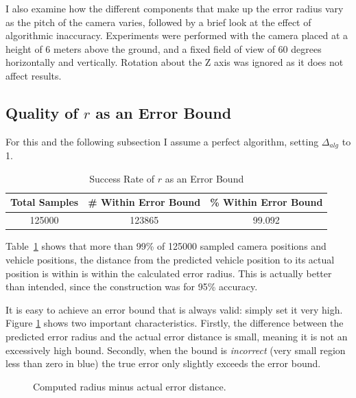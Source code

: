 \documentclass[a4paper,12pt,twoside,openright]{report}
\begin{document}
I also examine how the different components that make up the error radius vary
as the pitch of the camera varies, followed by a brief look at the
effect of algorithmic inaccuracy. Experiments were performed
with the camera placed at a height of 6 meters above the ground, and a fixed
field of view of 60 degrees horizontally and vertically. Rotation about the Z axis
was ignored as it does not affect results.

\subsection{Quality of $r$ as an Error Bound}

For this and the following subsection I assume a perfect algorithm,
setting $\Delta_{alg}$ to 1.

\begin{table}[htb]
    \centering
    \caption[$r$ as an ErrorBound]{Success Rate of $r$ as an Error Bound}
    \label{tab:camera:bound accuracy}
    \begin{tabular}{@{}ccc@{}}
        \toprule
        Total Samples & \# Within Error Bound & \% Within Error Bound \\ \midrule
        125000        & 123865                     & 99.092               
    \end{tabular}
\end{table}

Table~\ref{tab:camera:bound accuracy} shows that more than 99\% of 125000 sampled camera positions
and vehicle positions, the distance from the predicted vehicle position to 
its actual position is within is within the calculated error radius. This
is actually better than intended, since the construction was for 95\% accuracy.

It is easy to achieve an error bound that is always valid: simply set it very high.
Figure \ref{fig:camera:diff bound error} shows two important characteristics. Firstly, the difference between
the predicted error radius and the actual error distance is small, meaning
it is not an excessively high bound. Secondly, when the bound is \textit{incorrect} (very small region less than zero in blue)
the true error only slightly exceeds the error bound.

\begin{figure}[htb]
    \begin{center}
        
    \end{center}
    \caption[Bound Minus True Distance]{Computed radius minus actual error distance.}
    \label{fig:camera:diff bound error}
\end{figure}
\end{document}
